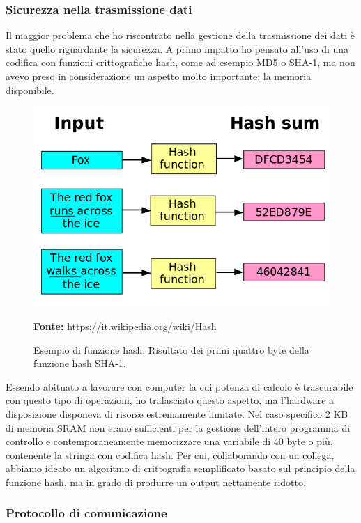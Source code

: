 \subsubsection{Sicurezza nella trasmissione dati}
Il maggior problema che ho riscontrato nella gestione della trasmissione dei dati è stato quello riguardante la sicurezza. A primo impatto ho pensato all'uso di una codifica con funzioni crittografiche hash, come ad esempio MD5 o SHA-1, ma non avevo preso in considerazione un aspetto molto importante: la memoria disponibile. 

\begin{figure}[H]
	\begin{center}
	\includegraphics[scale=0.4]{immagini/hash.png}
	\caption{Esempio di funzione hash. Risultato dei primi quattro byte della funzione hash SHA-1.}
	\small{\textbf{Fonte:} \url{https://it.wikipedia.org/wiki/Hash}}
	\end{center}
\end{figure}

Essendo abituato a lavorare con computer la cui potenza di calcolo è trascurabile con questo tipo di operazioni, ho tralasciato questo aspetto, ma l'hardware a disposizione disponeva di risorse estremamente limitate. Nel caso specifico 2 KB di memoria SRAM non erano sufficienti per la gestione dell'intero programma di controllo e contemporaneamente memorizzare una variabile di 40 byte o più, contenente la stringa con codifica hash. Per cui, collaborando con un collega, abbiamo ideato un algoritmo di crittografia semplificato basato sul principio della funzione hash, ma in grado di produrre un output nettamente ridotto.


\subsubsection{Protocollo di comunicazione}

